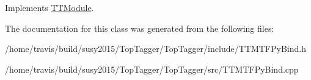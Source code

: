 Implements \hyperlink{classTTModule_a14e7c03fbf4ee1a5008c9344adc7c896}{T\-T\-Module}.



The documentation for this class was generated from the following files\-:\begin{DoxyCompactItemize}
\item 
/home/travis/build/susy2015/\-Top\-Tagger/\-Top\-Tagger/include/T\-T\-M\-T\-F\-Py\-Bind.\-h\item 
/home/travis/build/susy2015/\-Top\-Tagger/\-Top\-Tagger/src/T\-T\-M\-T\-F\-Py\-Bind.\-cpp\end{DoxyCompactItemize}
